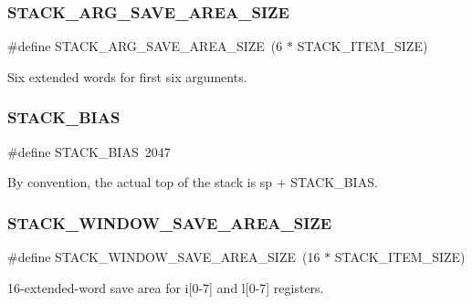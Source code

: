 \subsubsection{\texorpdfstring{STACK\_ARG\_SAVE\_AREA\_SIZE}{STACK\_ARG\_SAVE\_AREA\_SIZE}}
{\footnotesize\ttfamily \#define S\+T\+A\+C\+K\+\_\+\+A\+R\+G\+\_\+\+S\+A\+V\+E\+\_\+\+A\+R\+E\+A\+\_\+\+S\+I\+ZE~(6 $\ast$ S\+T\+A\+C\+K\+\_\+\+I\+T\+E\+M\+\_\+\+S\+I\+ZE)}

Six extended words for first six arguments. \mbox{\label{group__RTEMSBSPsSPARC64_ga2c2951039a73048a1c64c447591e4bb4}} 
\subsubsection{\texorpdfstring{STACK\_BIAS}{STACK\_BIAS}}
{\footnotesize\ttfamily \#define S\+T\+A\+C\+K\+\_\+\+B\+I\+AS~2047}

By convention, the actual top of the stack is sp + S\+T\+A\+C\+K\+\_\+\+B\+I\+AS. \mbox{\label{group__RTEMSBSPsSPARC64_gafd58a5d05425a8f8968b23f46cb78bc1}} 
\subsubsection{\texorpdfstring{STACK\_WINDOW\_SAVE\_AREA\_SIZE}{STACK\_WINDOW\_SAVE\_AREA\_SIZE}}
{\footnotesize\ttfamily \#define S\+T\+A\+C\+K\+\_\+\+W\+I\+N\+D\+O\+W\+\_\+\+S\+A\+V\+E\+\_\+\+A\+R\+E\+A\+\_\+\+S\+I\+ZE~(16 $\ast$ S\+T\+A\+C\+K\+\_\+\+I\+T\+E\+M\+\_\+\+S\+I\+ZE)}

16-\/extended-\/word save area for i\mbox{[}0-\/7\mbox{]} and l\mbox{[}0-\/7\mbox{]} registers. 